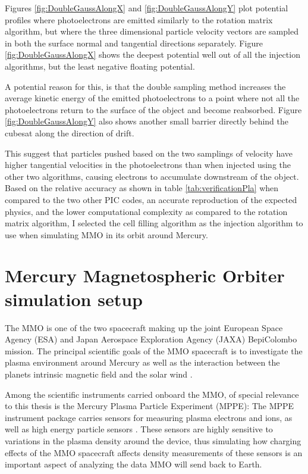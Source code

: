 Figures \ref{fig:DoubleGaussAlongX} and \ref{fig:DoubleGaussAlongY} plot potential profiles where photoelectrons are emitted similarly to the rotation matrix algorithm, but where the three dimensional particle velocity vectors are sampled in both the surface normal and tangential directions separately. Figure \ref{fig:DoubleGaussAlongX} shows the deepest potential well out of all the injection algorithms, but the least negative floating potential. 

A potential reason for this, is that the double sampling method increases the average kinetic energy of the emitted photoelectrons to a point where not all the photoelectrons return to the surface of the object and become reabsorbed. Figure \ref{fig:DoubleGaussAlongY} also shows another small barrier directly behind the cubesat along the direction of drift. 

This suggest that particles pushed based on the two samplings of velocity have higher tangential velocities in the photoelectrons than when injected using the other two algorithms, causing electrons to accumulate downstream of the object. Based on the relative accuracy as shown in table \ref{tab:verificationPla} when compared to the two other PIC codes, an accurate reproduction of the expected physics, and the lower computational complexity as compared to the rotation matrix algorithm, I selected the cell filling algorithm as the injection algorithm to use when simulating MMO in its orbit around Mercury.

\section{Mercury Magnetospheric Orbiter simulation setup}
The MMO is one of the two spacecraft making up the joint European Space Agency (ESA) and Japan Aerospace Exploration Agency (JAXA) BepiColombo mission. The principal scientific goals of the MMO spacecraft is to investigate the plasma environment around Mercury as well as the interaction between the planets intrinsic magnetic field and the solar wind  \parencite{Benkhoff2009} \parencite{Saito2010}. 

Among the scientific instruments carried onboard the MMO, of special relevance to this thesis is the Mercury Plasma Particle Experiment (MPPE): The MPPE instrument package carries sensors for measuring plasma electrons and ions, as well as high energy particle sensors \parencite{Saito2010}. These sensors are highly sensitive to variations in the plasma density around the device, thus simulating how charging effects of the MMO spacecraft affects density measurements of these sensors is an important aspect of analyzing the data MMO will send back to Earth.


